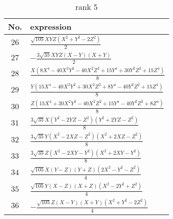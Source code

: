 \documentclass[fleqn,8pt,landscape]{jsarticle}
\begin{document}
\begin{table}[ht!]
\begin{center}
\caption{rank 5}
\renewcommand{\arraystretch}{1.3}
\begin{tabular}{cl} \hline \hline
No. & expression \\ \hline
$ 26 $ & $ \frac{\sqrt{105} X Y Z \left(X^{2} + Y^{2} - 2 Z^{2}\right)}{2} $ \\
$ 27 $ & $ - \frac{3 \sqrt{35} X Y Z \left(X - Y\right) \left(X + Y\right)}{2} $ \\
$ 28 $ & $ \frac{X \left(8 X^{4} - 40 X^{2} Y^{2} - 40 X^{2} Z^{2} + 15 Y^{4} + 30 Y^{2} Z^{2} + 15 Z^{4}\right)}{8} $ \\
$ 29 $ & $ \frac{Y \left(15 X^{4} - 40 X^{2} Y^{2} + 30 X^{2} Z^{2} + 8 Y^{4} - 40 Y^{2} Z^{2} + 15 Z^{4}\right)}{8} $ \\
$ 30 $ & $ \frac{Z \left(15 X^{4} + 30 X^{2} Y^{2} - 40 X^{2} Z^{2} + 15 Y^{4} - 40 Y^{2} Z^{2} + 8 Z^{4}\right)}{8} $ \\
$ 31 $ & $ \frac{3 \sqrt{35} X \left(Y^{2} - 2 Y Z - Z^{2}\right) \left(Y^{2} + 2 Y Z - Z^{2}\right)}{8} $ \\
$ 32 $ & $ \frac{3 \sqrt{35} Y \left(X^{2} - 2 X Z - Z^{2}\right) \left(X^{2} + 2 X Z - Z^{2}\right)}{8} $ \\
$ 33 $ & $ \frac{3 \sqrt{35} Z \left(X^{2} - 2 X Y - Y^{2}\right) \left(X^{2} + 2 X Y - Y^{2}\right)}{8} $ \\
$ 34 $ & $ \frac{\sqrt{105} X \left(Y - Z\right) \left(Y + Z\right) \left(2 X^{2} - Y^{2} - Z^{2}\right)}{4} $ \\
$ 35 $ & $ \frac{\sqrt{105} Y \left(X - Z\right) \left(X + Z\right) \left(X^{2} - 2 Y^{2} + Z^{2}\right)}{4} $ \\
$ 36 $ & $ - \frac{\sqrt{105} Z \left(X - Y\right) \left(X + Y\right) \left(X^{2} + Y^{2} - 2 Z^{2}\right)}{4} $ \\
 \hline \hline
\end{tabular}
\end{center}
\end{table}
\end{document}

